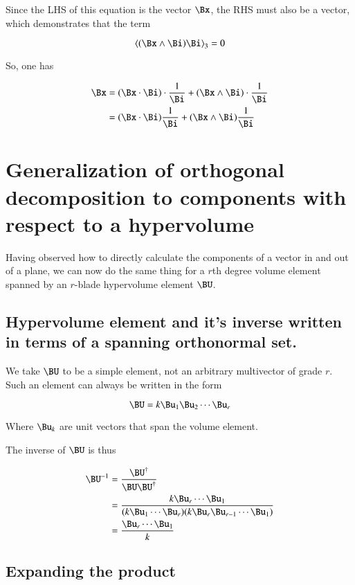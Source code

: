 Since the LHS of this equation is the vector $\Bx$, the RHS must
also be a vector, which demonstrates that the term

\[
\left<(\Bx \wedge \Bi) \Bi\right>_3 = 0
\]

So, one has

\begin{align*}
\Bx 
&=
{(\Bx \cdot \Bi) \cdot \frac{1}{\Bi}} + {(\Bx \wedge \Bi) \cdot \frac{1}{\Bi}} \\
&=
{(\Bx \cdot \Bi) \frac{1}{\Bi}} + {(\Bx \wedge \Bi) \frac{1}{\Bi}} \\
\end{align*}

\section{Generalization of orthogonal decomposition to components with respect to a hypervolume }

Having observed how to directly calculate the components of a vector in and out of a plane, we can now do the
same thing for a $r$th degree volume element spanned by an $r$-blade hypervolume element $\BU$.

\subsection{Hypervolume element and it's inverse written in terms of a spanning orthonormal set. }
We take $\BU$ to be a simple element, not an arbitrary multivector of grade $r$.  Such an element can 
always be written in the form

\[
\BU = k \Bu_1 \Bu_2 \cdots \Bu_r
\]

Where $\Bu_k$ are unit vectors that span the volume element.

The inverse of $\BU$ is thus

\begin{align*}
\BU^{-1}
&= \frac{\BU^\dagger}{\BU \BU^\dagger} \\
&= \frac{k \Bu_r \cdots \Bu_1}{(k \Bu_1 \cdots \Bu_r)(k \Bu_r \Bu_{r-1} \cdots \Bu_1)} \\
&= \frac{\Bu_r \cdots \Bu_1}{k} \\
\end{align*}

\subsection{Expanding the product }

